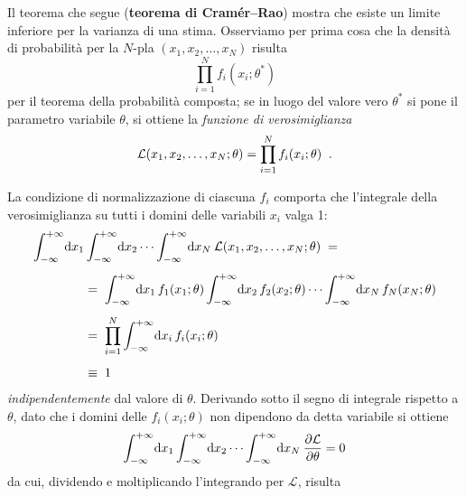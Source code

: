 %
Il teorema che segue (\textbf{teorema di Cram\'er--Rao})
mostra che esiste un limite inferiore per la varianza di una
stima.  Osserviamo per prima cosa che la densit\`a di
probabilit\`a per la $N$-pla $(x_1, x_2,\ldots, x_N)$
risulta
\begin{equation*}
  \prod_{i=1}^N f_i (x_i;\theta^*)
\end{equation*}
per il teorema della probabilit\`a composta; se in luogo del
valore vero $\theta^*$ si pone il parametro variabile
$\theta$, si ottiene la \emph{funzione di verosimiglianza}
\begin{equation*}
  \mathcal{L} (x_1, x_2,\ldots, x_N;\theta) =
    \prod_{i=1}^N f_i (x_i;\theta) \peq .
\end{equation*}

La condizione di normalizzazione di ciascuna $f_i$ comporta
che l'integrale della verosimiglianza su tutti i domini
delle variabili $x_i$ valga 1:
\begin{equation*}
  \begin{split}
    \int_{-\infty}^{+\infty} \! \de x_1
      &\int_{-\infty}^{+\infty} \! \de x_2 \cdots
      \int_{-\infty}^{+\infty} \! \de x_N \:
      \mathcal{L} (x_1, x_2,\ldots, x_N;\theta)
      \; = \\[1ex]
    &= \; \int_{-\infty}^{+\infty} \! \de x_1 \,
      f_1(x_1;\theta)
      \int_{-\infty}^{+\infty} \! \de x_2 \,
      f_2(x_2;\theta) \cdots
      \int_{-\infty}^{+\infty} \! \de x_N \,
      f_N(x_N;\theta) \\[1ex]
    &= \; \prod_{i=1}^N \int_{-\infty}^{+\infty} \!
      \de x_i \, f_i(x_i;\theta) \\[1ex]
      &\equiv \; 1
  \end{split}
\end{equation*}
\emph{indipendentemente} dal valore di $\theta$.  Derivando
sotto il segno di integrale rispetto a $\theta$, dato che i
domini delle $f_i(x_i;\theta)$ non dipendono da detta
variabile si ottiene
\begin{equation*}
  \int_{-\infty}^{+\infty} \! \mathrm{d} x_1
    \int_{-\infty}^{+\infty} \! \mathrm{d} x_2 \cdots
    \int_{-\infty}^{+\infty} \! \mathrm{d} x_N \:
    \frac{\partial \mathcal{L}}{\partial \theta}
    = 0
\end{equation*}
da cui, dividendo e moltiplicando l'integrando per
$\mathcal{L}$, risulta
